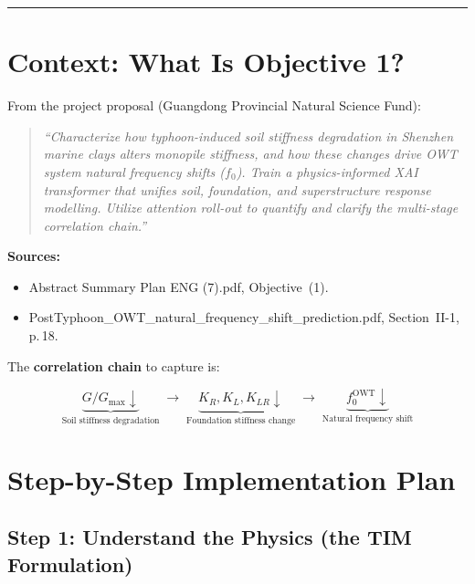 \documentclass[11pt,a4paper]{article}
\begin{document}
\vspace{1em}
\hrule
\vspace{1em}

\section{Context: What Is Objective 1?}

From the project proposal (Guangdong Provincial Natural Science Fund):

\begin{quote}
\textit{``Characterize how typhoon-induced soil stiffness degradation in Shenzhen
marine clays alters monopile stiffness, and how these changes drive OWT system
natural frequency shifts ($f_0$). Train a physics-informed XAI transformer that
unifies soil, foundation, and superstructure response modelling. Utilize attention
roll-out to quantify and clarify the multi-stage correlation chain.''}
\end{quote}

\textbf{Sources:}
\begin{itemize}[noitemsep]
  \item Abstract Summary Plan ENG (7).pdf, Objective~(1).
  \item PostTyphoon\_OWT\_natural\_frequency\_shift\_prediction.pdf, Section~II-1, p.\,18.
\end{itemize}

The \textbf{correlation chain} to capture is:

\[
\underbrace{G/G_{\max} \downarrow}_{\text{Soil stiffness degradation}}
\;\longrightarrow\;
\underbrace{K_R, K_L, K_{LR} \downarrow}_{\text{Foundation stiffness change}}
\;\longrightarrow\;
\underbrace{f_0^{\text{OWT}} \downarrow}_{\text{Natural frequency shift}}
\]

\section{Step-by-Step Implementation Plan}

\subsection{Step 1: Understand the Physics (the TIM Formulation)}
\end{document}
